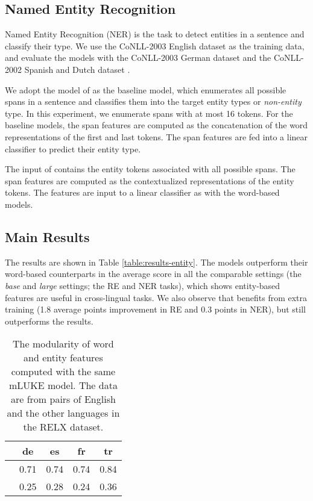 \documentclass[11pt]{article}
\newcommand{\minisection}[1]{\noindent{\bf {#1}.}}
\begin{document}
\subsection{Named Entity Recognition}
Named Entity Recognition (NER) is the task to detect entities in a sentence and classify their type.
We use the CoNLL-2003 English dataset \citep{TjongKimSang-DeMeulder:2003:CONLL} as the training data, and evaluate the models with the CoNLL-2003 German dataset and the CoNLL-2002 Spanish and Dutch dataset \citep{tjong-kim-sang-2002-introduction}.

\minisection{Models}
We adopt the model of \citet{Sohrab2018DeepRecognition} as the baseline model, which enumerates all possible spans in a sentence and classifies them into the target entity types or {\it non-entity} type. In this experiment, we enumerate spans with at most 16 tokens.
For the baseline models, the span features are computed as the concatenation of the word representations of the first and last tokens.
The span features are fed into a linear classifier to predict their entity type.

The input of \mlukeE{} contains the entity \mask{} tokens associated with all possible spans.
The span features are computed as the contextualized representations of the entity \mask{} tokens.
The features are input to a linear classifier as with the word-based models.

\subsection{Main Results}
The results are shown in Table \ref{table:results-entity}.
The \mlukeE{} models outperform their word-based counterparts \mlukeW{} in the average score in all the comparable settings (the {\it base} and {\it large} settings; the RE and NER tasks), which shows entity-based features are useful in cross-lingual tasks.
We also observe that \xlmr{}\ba{} benefits from extra training (1.8 average points improvement in RE and 0.3 points in NER), but \mlukeE{} still outperforms the results.

\begin{table}[ht]
  \centering
  \begin{tabular}{lcccc} \toprule
            & de   & es   & fr   & tr   \\ \midrule
  \mlukeW{}\ba{} & 0.71 & 0.74 & 0.74 & 0.84 \\
  \mlukeE{}\ba{} & 0.25 & 0.28 & 0.24 & 0.36 \\ \bottomrule
  \end{tabular}
  \caption{The modularity of word and entity features computed with the same mLUKE model. The data are from pairs of English and the other languages in the RELX dataset.}
  \label{table:modularity}
\end{table}
\end{document}

